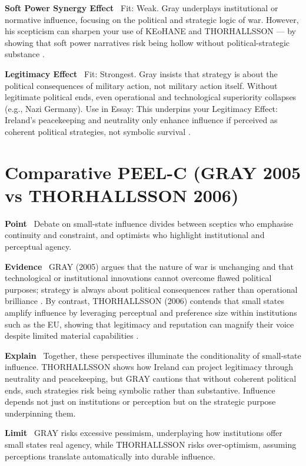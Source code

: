 \textbf{Soft Power Synergy Effect} \
Fit: Weak. Gray underplays institutional or normative influence, focusing on the political and strategic logic of war. However, his scepticism can sharpen your use of KEoHANE and THORHALLSSON — by showing that soft power narratives risk being hollow without political-strategic substance \parencite{GRAY_2005}.

\textbf{Legitimacy Effect} \
Fit: Strongest. Gray insists that strategy is about the political consequences of military action, not military action itself. Without legitimate political ends, even operational and technological superiority collapses (e.g., Nazi Germany).
Use in Essay: This underpins your Legitimacy Effect: Ireland’s peacekeeping and neutrality only enhance influence if perceived as coherent political strategies, not symbolic survival \parencite{GRAY_2005}.

\section*{Comparative PEEL-C (GRAY 2005 vs THORHALLSSON 2006)}

\textbf{Point} \
Debate on small-state influence divides between sceptics who emphasise continuity and constraint, and optimists who highlight institutional and perceptual agency.

\textbf{Evidence} \
GRAY (2005) argues that the nature of war is unchanging and that technological or institutional innovations cannot overcome flawed political purposes; strategy is always about political consequences rather than operational brilliance \parencite{GRAY_2005}. By contrast, THORHALLSSON (2006) contends that small states amplify influence by leveraging perceptual and preference size within institutions such as the EU, showing that legitimacy and reputation can magnify their voice despite limited material capabilities \parencite{THORHALLSSON_2006}.

\textbf{Explain} \
Together, these perspectives illuminate the conditionality of small-state influence. THORHALLSSON shows how Ireland can project legitimacy through neutrality and peacekeeping, but GRAY cautions that without coherent political ends, such strategies risk being symbolic rather than substantive. Influence depends not just on institutions or perception but on the strategic purpose underpinning them.

\textbf{Limit} \
GRAY risks excessive pessimism, underplaying how institutions offer small states real agency, while THORHALLSSON risks over-optimism, assuming perceptions translate automatically into durable influence.

